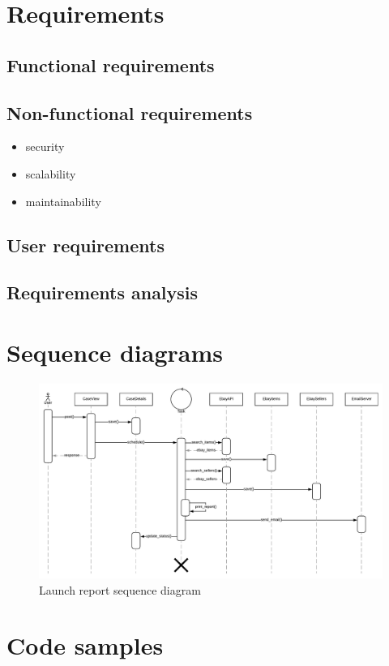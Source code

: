 \section{Requirements}

\subsection{Functional requirements}

\subsection{Non-functional requirements}

\begin{itemize}
  \item security
  \item scalability
  \item maintainability
\end{itemize}

\subsection{User requirements}

\subsection{Requirements analysis}

\section{Sequence diagrams}

\begin{figure}[h!]
\centering
\includegraphics[angle=90, scale=0.7]{imgs/SequenceDiagram.pdf}
\caption{Launch report sequence diagram}
\label{fig:sysarch}
\end{figure}

\section{Code samples}
